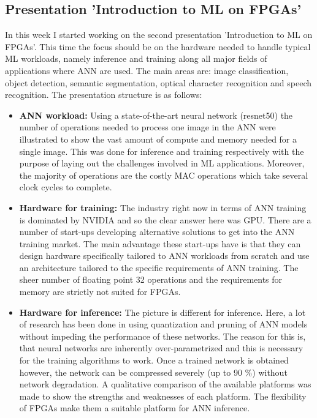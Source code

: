 \subsection{Presentation 'Introduction to \ac{ML} on \acp{FPGA}'}
In this week I started working on the second presentation 'Introduction to \ac{ML} on \acp{FPGA}'. This time the focus should be on the hardware needed to handle typical \ac{ML} workloads, namely inference and training along all major fields of applications where \ac{ANN} are used. The main areas are: image classification, object detection, semantic segmentation, optical character recognition and speech recognition. The presentation structure is as follows:
\begin{itemize}
	\item \textbf{\ac{ANN} workload:} Using a state-of-the-art neural network (resnet50) the number of operations needed to process one image in the \ac{ANN} were illustrated to show the vast amount of compute and memory needed for a single image. This was done for inference and training respectively with the purpose of laying out the challenges involved in \ac{ML} applications. Moreover, the majority of operations are the costly \ac{MAC} operations which take several clock cycles to complete.
	\item \textbf{Hardware for training:} The industry right now in terms of \ac{ANN} training is dominated by NVIDIA and so the clear answer here was \ac{GPU}. There are a number of start-ups developing alternative solutions to get into the \ac{ANN} training market. The main advantage these start-ups have is that they can design hardware specifically tailored to \ac{ANN} workloads from scratch and use an architecture tailored to the specific requirements of \ac{ANN} training. The sheer number of floating point 32 operations and the requirements for memory are strictly not suited for \acp{FPGA}.
	\item \textbf{Hardware for inference:} The picture is different for inference. Here, a lot of research has been done in using quantization and pruning of \ac{ANN} models without impeding the performance of these networks. The reason for this is, that neural networks are inherently over-parametrized and this is necessary for the training algorithms to work. Once a trained network is obtained however, the network can be compressed severely (up to 90 \%) without network degradation. A qualitative comparison of the available platforms was made to show the strengths and weaknesses of each platform. The flexibility of \acp{FPGA} make them a suitable platform for \ac{ANN} inference.

\end{itemize}
